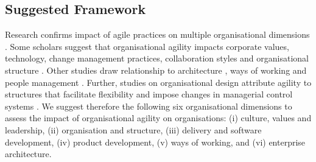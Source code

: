 \documentclass{article}
\begin{document}












\subsection{Suggested Framework}
\label{subsec:framework}




Research confirms impact of agile practices on multiple organisational dimensions \cite{sherehiy2007, wendler2013}. Some scholars suggest that organisational agility impacts corporate values, technology, change management practices, collaboration styles and organisational structure \cite{wendler2012}. Other studies draw relationship to architecture \cite{leffingwell2008principles}, ways of working  \cite{Lindsjorn2016} and people management \cite{menon2001}. Further, studies on organisational design attribute agility to structures that facilitate flexibility and impose changes in managerial control systems \cite{bernstein2016, kotter2012accelerate}. We suggest therefore the following six organisational dimensions to assess the impact of organisational agility on organisations:
 (i) culture, values and leadership, (ii) organisation and structure, (iii) delivery and software development, (iv) product development, (v) ways of working, and (vi) enterprise architecture.
\end{document}
